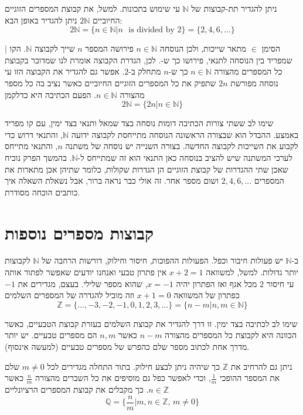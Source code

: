 \documentclass[
  hebrew,
  12pt,
  a4paper,
  oneside]{book}
\theoremstyle{definition}
\theoremstyle{remark}
\theoremstyle{plain}
\theoremstyle{remark}
\begin{document}
ניתן להגדיר תת-קבוצות של \(\mathbb{N}\) עי שימוש בתכונות. למשל, את קבוצת
המספרים הזוגיים החיוביים \(2\mathbb{N}\) ניתן להגדיר באופן הבא:
\[2\mathbb{N}=\{n\in\mathbb{N}|n\text{ {is divided by} 2}\}=\{2,4,6,...\}\]

הסימן \(\in\) מתאר שייכות, ולכן הנוסחה \(n\in\mathbb{N}\) פירושה המספר
\(n\) שייך לקבוצה \(\mathbb{N}\). הקו \(|\) שמפריד בין הנוסחה לתנאי,
פירושו כך ש-. לכן, הגדרת הקבוצה אומרת לנו שמדובר בקבוצת כל המספרים
מהצורה \(n\in\mathbb{N}\) כך ש-\(n\) מתחלק ב-\(2\). אפשר גם להגדיר את
הקבוצה הזו עי נוסחה מפורשת \(2n\) שתפיק את כל המספרים הזוגיים החיוביים
כאשר נציב בה כל מספר מהצורה \(n\in\mathbb{N}\). הפעם הכתיבה היא כדלקמן
\[2\mathbb{N}=\{2n|n\in\mathbb{N}\}\]

שימו לב ששתי צורות הכתיבה דומות נוסחה בצד שמאל ותנאי בצד ימין, עם קו
מפריד באמצע. ההבדל הוא שבצורה הראשונה הנוסחה מתייחסת לקבוצה ידועה
\(\mathbb{N}\), והתנאי דרוש כדי לקבוע את השייכות לקבוצה החדשה. בצורה
השנייה יש נוסחה של משתנה \(n\), והתנאי מתייחס לערכי המשתנה שיש להציב
בנוסחה כאן התנאי הוא זה שמתייחס ל-\(\mathbb{N}\). בהמשך הפרק נוכיח שאכן
שתי ההגדרות של קבוצת הזוגיים הן הגדרות שקולות, כלומר שתיהן אכן מתארות את
המספרים \(2,4,6,...\) ושום מספר אחר. זה אולי כבר נראה ברור, אבל נשאלת
השאלה איך כותבים הוכחה מסודרת.

\section{קבוצות מספרים
נוספות}\label{ux5e7ux5d1ux5d5ux5e6ux5d5ux5ea-ux5deux5e1ux5e4ux5e8ux5d9ux5dd-ux5e0ux5d5ux5e1ux5e4ux5d5ux5ea}

ב-\(\mathbb{N}\) יש פעולות חיבור וכפל. הפעולות ההפוכות, חיסור וחילוק,
דורשות הרחבה של \(\mathbb{N}\) לקבוצות יותר גדולות. למשל, למשוואה
\(x+2=1\) אין פתרון טבעי ואנחנו יודעים שאפשר לפתור אותה עי חיסור \(2\)
מכל אגף ואז הפתרון יהיה \(x=-1\), שהוא מספר שלילי. בעצם, מגדירים את
\(-1\) כפתרון של המשוואה \(x+1=0\) וזה מוביל להגדרה של המספרים השלמים
\[\mathbb{Z}=\{...,-3,-2,-1,0,1,2,3,...\}=\{n-m|n,m\in\mathbb{\mathbb{N}}\}\]

שימו לב לכתיבה בצד ימין. זו דרך להגדיר את קבוצת השלמים בעזרת קבוצת
הטבעיים, כאשר הכוונה היא לקבוצת כל המספרים מהצורה \(n-m\) כאשר \(n,m\)
הם מספרים טבעיים. יש יותר מדרך אחת לכתוב מספר שלם כהפרש של מספרים טבעיים
(למעשה אינסוף).

ניתן גם להרחיב את \(\mathbb{Z}\) כך שיהיה ניתן לבצע חילוק. בתור התחלה
מגדירים לכל \(m\neq0\) שלם את המספר ההופכי \(\frac{1}{m}\), וכדי לאפשר
כפל גם מוסיפים את כל השברים מהצורה \(\frac{n}{m}\) כאשר
\(n\in\mathbb{Z}\). כך מקבלים את קבוצת המספרים הרציונליים
\[\mathbb{Q}=\{\frac{n}{m}|m,n\in\mathbb{\mathbb{Z}},\,m\neq0\}\]
\end{document}
